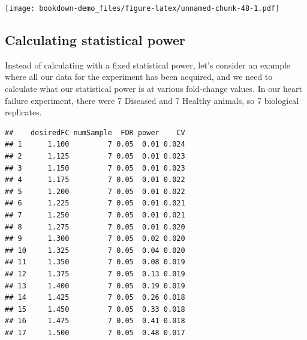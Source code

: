 \documentclass[]{book}
\newenvironment{Shaded}{\begin{snugshade}}{\end{snugshade}}
\newcommand{\CommentTok}[1]{\textcolor[rgb]{0.56,0.35,0.01}{\textit{#1}}}
\newcommand{\DataTypeTok}[1]{\textcolor[rgb]{0.13,0.29,0.53}{#1}}
\newcommand{\DecValTok}[1]{\textcolor[rgb]{0.00,0.00,0.81}{#1}}
\newcommand{\FloatTok}[1]{\textcolor[rgb]{0.00,0.00,0.81}{#1}}
\newcommand{\KeywordTok}[1]{\textcolor[rgb]{0.13,0.29,0.53}{\textbf{#1}}}
\newcommand{\NormalTok}[1]{#1}
\newcommand{\OperatorTok}[1]{\textcolor[rgb]{0.81,0.36,0.00}{\textbf{#1}}}
\newcommand{\OtherTok}[1]{\textcolor[rgb]{0.56,0.35,0.01}{#1}}
\newcommand{\StringTok}[1]{\textcolor[rgb]{0.31,0.60,0.02}{#1}}
\begin{document}
\texttt{[image: bookdown-demo\_files/figure-latex/unnamed-chunk-48-1.pdf]}

\hypertarget{calculating-statistical-power}{%
\subsection{Calculating statistical power}\label{calculating-statistical-power}}

Instead of calculating with a fixed statistical power, let's consider an example where all our data for the experiment has been acquired, and we need to calculate what our statistical power is at various fold-change values. In our heart failure experiment, there were 7 Diseased and 7 Healthy animals, so 7 biological replicates.

\begin{Shaded}
\end{Shaded}

\begin{verbatim}
##    desiredFC numSample  FDR power    CV
## 1      1.100         7 0.05  0.01 0.024
## 2      1.125         7 0.05  0.01 0.023
## 3      1.150         7 0.05  0.01 0.023
## 4      1.175         7 0.05  0.01 0.022
## 5      1.200         7 0.05  0.01 0.022
## 6      1.225         7 0.05  0.01 0.021
## 7      1.250         7 0.05  0.01 0.021
## 8      1.275         7 0.05  0.01 0.020
## 9      1.300         7 0.05  0.02 0.020
## 10     1.325         7 0.05  0.04 0.020
## 11     1.350         7 0.05  0.08 0.019
## 12     1.375         7 0.05  0.13 0.019
## 13     1.400         7 0.05  0.19 0.019
## 14     1.425         7 0.05  0.26 0.018
## 15     1.450         7 0.05  0.33 0.018
## 16     1.475         7 0.05  0.41 0.018
## 17     1.500         7 0.05  0.48 0.017
\end{verbatim}
\end{document}
